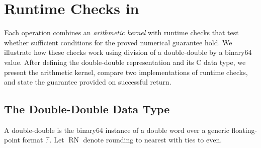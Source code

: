 \FloatBarrier
\section{Runtime Checks in \FenceDD}
\label{sec:overview}


\newsavebox{\sectiontwocbox}
\newenvironment{sectiontwocpanel}{%
  \begin{lrbox}{\sectiontwocbox}%
  \begin{minipage}{\dimexpr\linewidth-2\fboxsep\relax}%
}{%
  \end{minipage}%
  \end{lrbox}%
  \noindent\colorbox{gray!5}{\usebox{\sectiontwocbox}}%
}

Each \FenceDD{} operation combines an \emph{arithmetic kernel} with
runtime checks that test whether sufficient conditions for the proved
numerical guarantee hold. We illustrate how these checks work using
division of a double-double by a binary64 value. After defining the
double-double representation and its C data type, we present the
arithmetic kernel, compare two implementations of runtime checks, and
state the guarantee provided on successful return.

\subsection{The Double-Double Data Type}
\label{sec:overview-values}

A double-double is the binary64 instance of a double word over a generic
floating-point format $\mathbb{F}$. Let $\operatorname{RN}$ denote rounding
to nearest with ties to even.


